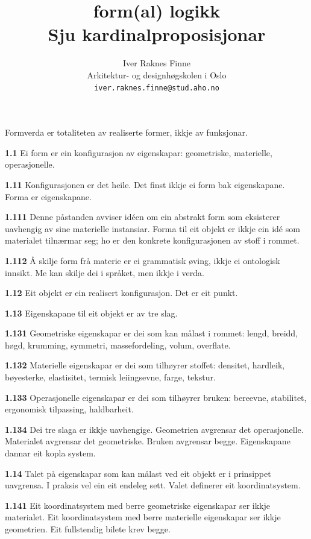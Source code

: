 \documentclass[11pt, a4paper]{article}
\title{%
  \vspace{-1cm}
  {\huge\textbf{form(al) logikk}}\\[0.8em]
  {\Large Sju kardinalproposisjonar}
}
\author{Iver Raknes Finne\\
\small Arkitektur- og designh\o gskolen i Oslo\\
\small \texttt{iver.raknes.finne@stud.aho.no}}
\date{}
\newcommand{\prop}[1]{\bigskip\noindent{\Large\textbf{\textcolor{propcolor}{#1}}}\quad}
\newcommand{\subprop}[1]{\medskip\noindent\textbf{#1}\quad}
\begin{document}
\maketitle
\thispagestyle{empty}



\prop{1} Formverda er totaliteten av realiserte former, ikkje av funksjonar.

\subprop{1.1} Ei form er ein konfigurasjon av eigenskapar: geometriske, materielle, operasjonelle.

\subprop{1.11} Konfigurasjonen er det heile. Det finst ikkje ei form bak eigenskapane. Forma er eigenskapane.

\subprop{1.111} Denne p\aa standen avviser id\'een om ein abstrakt form som eksisterer uavhengig av sine materielle instansiar. Forma til eit objekt er ikkje ein id\'e som materialet tiln\ae rmar seg; ho er den konkrete konfigurasjonen av stoff i rommet.

\subprop{1.112} \AA{} skilje form fr\aa{} materie er ei grammatisk \o ving, ikkje ei ontologisk innsikt. Me kan skilje dei i spr\aa ket, men ikkje i verda.

\subprop{1.12} Eit objekt er ein realisert konfigurasjon. Det er eit punkt.

\subprop{1.13} Eigenskapane til eit objekt er av tre slag.

\subprop{1.131} Geometriske eigenskapar er dei som kan m\aa last i rommet: lengd, breidd, h\o gd, krumming, symmetri, massefordeling, volum, overflate.

\subprop{1.132} Materielle eigenskapar er dei som tilh\o yrer stoffet: densitet, hardleik, b\o yesterke, elastisitet, termisk leiingsevne, farge, tekstur.

\subprop{1.133} Operasjonelle eigenskapar er dei som tilh\o yrer bruken: bereevne, stabilitet, ergonomisk tilpassing, haldbarheit.

\subprop{1.134} Dei tre slaga er ikkje uavhengige. Geometrien avgrensar det operasjonelle. Materialet avgrensar det geometriske. Bruken avgrensar begge. Eigenskapane dannar eit kopla system.

\subprop{1.14} Talet p\aa{} eigenskapar som kan m\aa last ved eit objekt er i prinsippet uavgrensa. I praksis vel ein eit endeleg sett. Valet definerer eit koordinatsystem.

\subprop{1.141} Eit koordinatsystem med berre geometriske eigenskapar ser ikkje materialet. Eit koordinatsystem med berre materielle eigenskapar ser ikkje geometrien. Eit fullstendig bilete krev begge.
\end{document}
